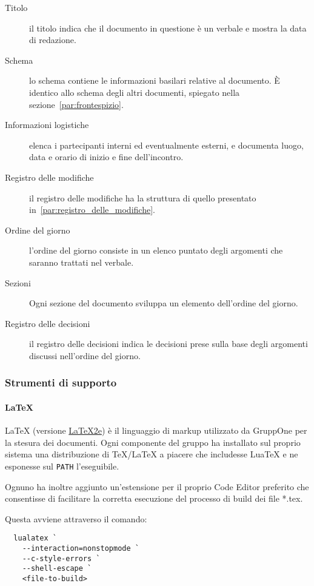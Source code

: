 \documentclass[../../norme-di-progetto.tex]{subfiles}
\begin{document}
\begin{description}
  \item [Titolo] il titolo indica che il documento in questione è un verbale e mostra la data di redazione.
  \item [Schema] lo schema contiene le informazioni basilari relative al documento. È identico allo schema degli altri documenti, spiegato nella sezione~\ref{par:frontespizio}.
  \item [Informazioni logistiche] elenca i partecipanti interni ed eventualmente esterni, e documenta luogo, data e orario di inizio e fine dell'incontro.
  \item [Registro delle modifiche] il registro delle modifiche ha la struttura di quello presentato in~\ref{par:registro_delle_modifiche}.
  \item [Ordine del giorno] l'ordine del giorno consiste in un elenco puntato degli argomenti che saranno trattati nel verbale.
  \item [Sezioni] Ogni sezione del documento sviluppa un elemento dell'ordine del giorno.
  \item [Registro delle decisioni] il registro delle decisioni indica le decisioni prese sulla base degli argomenti discussi nell'ordine del giorno.
\end{description}

\subsubsection{Strumenti di supporto}

\paragraph{\LaTeX}%
\label{par:LaTeX}
\LaTeX{} (versione \href{https://texfaq.org/FAQ-latex2e}{\LaTeX2e}) è il linguaggio di markup utilizzato da GruppOne per la stesura dei documenti.
Ogni componente del gruppo ha installato sul proprio sistema una distribuzione di \TeX{}/\LaTeX{} a piacere che includesse Lua\TeX{} e ne esponesse sul \verb|PATH| l'eseguibile.

Ognuno ha inoltre aggiunto un'estensione per il proprio Code Editor preferito che consentisse di facilitare la corretta esecuzione del processo di build dei file *.tex.

Questa avviene attraverso il comando:

\begin{verbatim}
  lualatex `
    --interaction=nonstopmode `
    --c-style-errors `
    --shell-escape `
    <file-to-build>
\end{verbatim}
\end{document}
